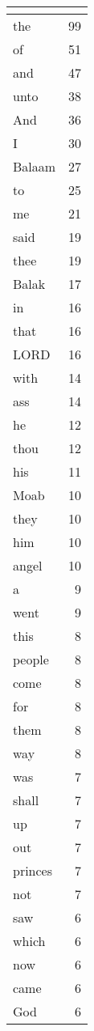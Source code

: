 \begin{center}
\begin{longtable}{l|r}
\hline \multicolumn{2}{c}{{ }} \\ \hline
\endfoot 
the & 99\\ \hline 
of & 51\\ \hline 
and & 47\\ \hline 
unto & 38\\ \hline 
And & 36\\ \hline 
I & 30\\ \hline 
Balaam & 27\\ \hline 
to & 25\\ \hline 
me & 21\\ \hline 
said & 19\\ \hline 
thee & 19\\ \hline 
Balak & 17\\ \hline 
in & 16\\ \hline 
that & 16\\ \hline 
LORD & 16\\ \hline 
with & 14\\ \hline 
ass & 14\\ \hline 
he & 12\\ \hline 
thou & 12\\ \hline 
his & 11\\ \hline 
Moab & 10\\ \hline 
they & 10\\ \hline 
him & 10\\ \hline 
angel & 10\\ \hline 
a & 9\\ \hline 
went & 9\\ \hline 
this & 8\\ \hline 
people & 8\\ \hline 
come & 8\\ \hline 
for & 8\\ \hline 
them & 8\\ \hline 
way & 8\\ \hline 
was & 7\\ \hline 
shall & 7\\ \hline 
up & 7\\ \hline 
out & 7\\ \hline 
princes & 7\\ \hline 
not & 7\\ \hline 
saw & 6\\ \hline 
which & 6\\ \hline 
now & 6\\ \hline 
came & 6\\ \hline 
God & 6\\ \hline 

\end{longtable}
\end{center}
